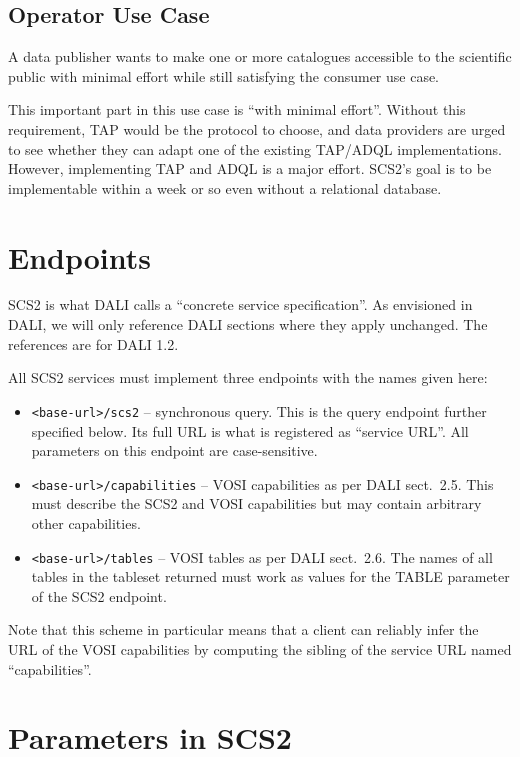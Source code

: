 \documentclass[11pt,a4paper]{ivoa}
\begin{document}
\begin{bigdescription}
\subsection{Operator Use Case}

A data publisher wants to make one or more catalogues accessible to the
scientific public with minimal effort while still satisfying the
consumer use case.

This important part in this use case is ``with minimal effort''.
Without this requirement, TAP would be the protocol to choose, and data
providers are urged to see whether they can adapt one of the existing
TAP/ADQL implementations.  However, implementing TAP and ADQL is a major
effort.  SCS2's goal is to be implementable within a week or so even
without a relational database.

\section{Endpoints}

SCS2 is what DALI \citep{2017ivoa.spec.0517D} calls a ``concrete service
specification''.  As envisioned in DALI, we will only reference DALI
sections where they apply unchanged.  The references are for DALI 1.2.

All SCS2 services must implement three endpoints with the names given
here:

\begin{itemize}
\item \verb|<base-url>/scs2| -- synchronous query.  This is the query
endpoint further specified below.  Its full URL is what is registered as
``service URL''.  All parameters on this endpoint are case-sensitive.

\item \verb|<base-url>/capabilities| -- VOSI capabilities as per DALI
sect.~2.5.  This must describe the SCS2 and VOSI capabilities but may
contain arbitrary other capabilities.

\item \verb|<base-url>/tables| -- VOSI tables as per DALI sect.~2.6.
The names of all tables in the tableset returned must work as values for
the TABLE parameter of the SCS2 endpoint.
\end{itemize}

Note that this scheme in particular means that a client can reliably
infer the URL of the VOSI capabilities by computing the sibling of the
service URL named ``capabilities''.

\section{Parameters in SCS2}


\end{bigdescription}
\end{document}
